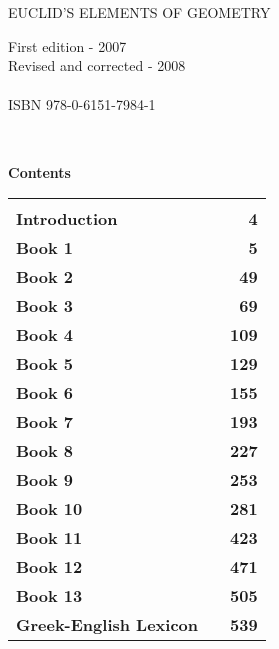 \thispagestyle{empty}
\begin{center}
{\Huge\sf EUCLID'S ELEMENTS OF GEOMETRY}\\
\mbox{}\spa\spa{}
\end{center}

\newpage
\thispagestyle{empty}
\begin{flushleft}
First edition - 2007\\
Revised and corrected - 2008\\
~\\
ISBN 978-0-6151-7984-1
\end{flushleft}

\newpage~\\
\thispagestyle{empty}
\begin{center}
{\Large\bf Contents}
\end{center}
\begin{tabular}{lcr}
&&\\[0.5ex]
{\bf Introduction}&\mbox{\hspace{12cm}}&{\bf 4}\\[3.ex]
{\bf Book 1}  && {\bf    5}\\[3.ex]
{\bf Book 2}  && {\bf  49}\\[3.ex]
{\bf Book 3}  && {\bf  69}\\[3.ex]
{\bf Book 4}  && {\bf 109}\\[3.ex]
{\bf Book 5}  && {\bf 129}\\[3.ex]
{\bf Book 6}  && {\bf  155}\\[3.ex]
{\bf Book 7}  && {\bf  193}\\[3.ex]
{\bf Book 8}  && {\bf  227}\\[3.ex]
{\bf Book 9}  && {\bf 253}\\[3.ex]
{\bf Book 10} &&{\bf 281}\\[3.ex]
{\bf Book 11}  && {\bf  423}\\[3.ex]
{\bf Book 12}  && {\bf 471}\\[3.ex]
{\bf Book 13} &&{\bf 505}\\[3.ex]
{\bf Greek-English Lexicon}&&{\bf 539}
\end{tabular}
\newpage

